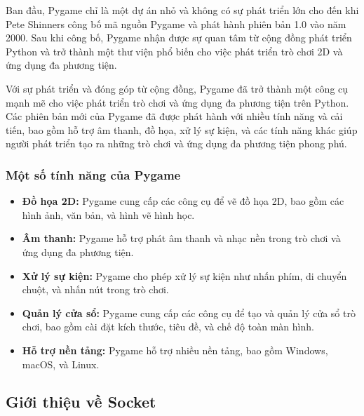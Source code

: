 \documentclass[a4paper]{article}
\begin{document}
Ban đầu, Pygame chỉ là một dự án nhỏ và không có sự phát triển lớn cho đến khi Pete Shinners công bố mã nguồn Pygame và phát hành phiên bản 1.0 vào năm 2000. Sau khi công bố, Pygame nhận được sự quan tâm từ cộng đồng phát triển Python và trở thành một thư viện phổ biến cho việc phát triển trò chơi 2D và ứng dụng đa phương tiện.

Với sự phát triển và đóng góp từ cộng đồng, Pygame đã trở thành một công cụ mạnh mẽ cho việc phát triển trò chơi và ứng dụng đa phương tiện trên Python. Các phiên bản mới của Pygame đã được phát hành với nhiều tính năng và cải tiến, bao gồm hỗ trợ âm thanh, đồ họa, xử lý sự kiện, và các tính năng khác giúp người phát triển tạo ra những trò chơi và ứng dụng đa phương tiện phong phú.

\subsubsection[short]{Một số tính năng của Pygame}
\begin{itemize}
	\item \textbf{Đồ họa 2D:} Pygame cung cấp các công cụ để vẽ đồ họa 2D, bao gồm các hình ảnh, văn bản, và hình vẽ hình học.
	\item \textbf{Âm thanh:} Pygame hỗ trợ phát âm thanh và nhạc nền trong trò chơi và ứng dụng đa phương tiện.
	\item \textbf{Xử lý sự kiện:} Pygame cho phép xử lý sự kiện như nhấn phím, di chuyển chuột, và nhấn nút trong trò chơi.
	\item \textbf{Quản lý cửa sổ:} Pygame cung cấp các công cụ để tạo và quản lý cửa sổ trò chơi, bao gồm cài đặt kích thước, tiêu đề, và chế độ toàn màn hình.
	\item \textbf{Hỗ trợ nền tảng:} Pygame hỗ trợ nhiều nền tảng, bao gồm Windows, macOS, và Linux.
\end{itemize}
\subsection{Giới thiệu về Socket}
\end{document}
